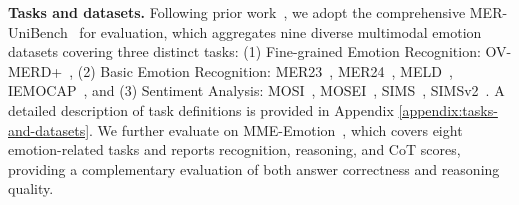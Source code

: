 \documentclass{article}
\theoremstyle{plain}
\theoremstyle{definition}
\theoremstyle{remark}
\begin{document}
\noindent\textbf{Tasks and datasets.}
Following prior work~\cite{lian2025affectgptr1}, we adopt the comprehensive MER-UniBench~\cite{lian2025affectgpt} for evaluation, which aggregates nine diverse multimodal emotion datasets covering three distinct tasks: (1) Fine-grained Emotion Recognition: OV-MERD+~\cite{lian2025affectgpt}, (2) Basic Emotion Recognition: MER23~\cite{lian2023mer}, MER24~\cite{lian2024mer}, MELD~\cite{poria2019meld}, IEMOCAP~\cite{busso2008iemocap}, and (3) Sentiment Analysis: MOSI~\cite{zadeh2016mosi}, MOSEI~\cite{zadeh2018multimodal}, SIMS~\cite{yu2020ch}, SIMSv2~\cite{liu2022make}. A detailed description of task definitions is provided in Appendix \ref{appendix:tasks-and-datasets}.
We further evaluate on MME-Emotion~\cite{zhang2025mme}, which covers eight emotion-related tasks and reports recognition, reasoning, and CoT scores, providing a complementary evaluation of both answer correctness and reasoning quality.
\end{document}
